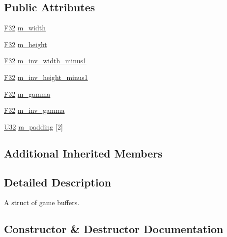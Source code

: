 \subsection*{Public Attributes}
\begin{DoxyCompactItemize}
\item 
\hyperlink{namespacemage_aa97e833b45f06d60a0a9c4fc22ae02c0}{F32} \hyperlink{structmage_1_1_game_buffer_a96c0f7cbd8fb9298b67be6fcedfae0ea}{m\+\_\+width}
\item 
\hyperlink{namespacemage_aa97e833b45f06d60a0a9c4fc22ae02c0}{F32} \hyperlink{structmage_1_1_game_buffer_a0daa4c82b772633085b27bf51b5b081c}{m\+\_\+height}
\item 
\hyperlink{namespacemage_aa97e833b45f06d60a0a9c4fc22ae02c0}{F32} \hyperlink{structmage_1_1_game_buffer_a2ebfec7129ca68d65dd5cf33e32b523e}{m\+\_\+inv\+\_\+width\+\_\+minus1}
\item 
\hyperlink{namespacemage_aa97e833b45f06d60a0a9c4fc22ae02c0}{F32} \hyperlink{structmage_1_1_game_buffer_a2f049063194681c3beabc63938754a89}{m\+\_\+inv\+\_\+height\+\_\+minus1}
\item 
\hyperlink{namespacemage_aa97e833b45f06d60a0a9c4fc22ae02c0}{F32} \hyperlink{structmage_1_1_game_buffer_a7c7abe0dbee37447b27c9e7f7c95d479}{m\+\_\+gamma}
\item 
\hyperlink{namespacemage_aa97e833b45f06d60a0a9c4fc22ae02c0}{F32} \hyperlink{structmage_1_1_game_buffer_a52ddb29e16782a4dcc4e6818b3983c20}{m\+\_\+inv\+\_\+gamma}
\item 
\hyperlink{namespacemage_a41c104c036fba3756a74e19f793eeaa1}{U32} \hyperlink{structmage_1_1_game_buffer_a6ab9b395e6cf4a6e120bb7ddf4be6913}{m\+\_\+padding} \mbox{[}2\mbox{]}
\end{DoxyCompactItemize}
\subsection*{Additional Inherited Members}


\subsection{Detailed Description}
A struct of game buffers. 

\subsection{Constructor \& Destructor Documentation}
\hypertarget{structmage_1_1_game_buffer_ade6ea6f9d04f829d990b848f9e210349}{}\label{structmage_1_1_game_buffer_ade6ea6f9d04f829d990b848f9e210349} 
